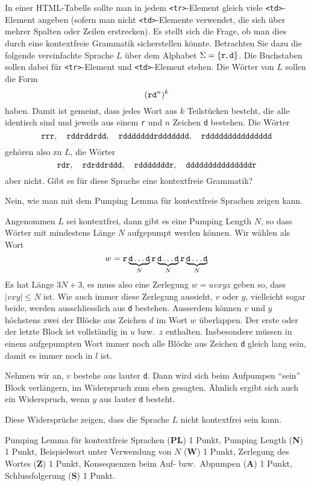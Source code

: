In einer HTML-Tabelle sollte man in jedem {\tt <tr>}-Element gleich
viele {\tt <td>}-Element angeben (sofern man nicht {\tt <td>}-Elemente
verwendet, die sich über mehrer Spalten oder Zeilen erstrecken).
Es stellt sich die Frage, ob man dies durch eine kontextfreie Grammatik
sicherstellen könnte.
Betrachten Sie dazu die folgende vereinfachte Sprache $L$ über dem Alphabet
$\Sigma=\{\text{\tt r}, \text{\tt d}\}$. Die Buchstaben sollen
dabei für {\tt <tr>}-Element und {\tt <td>}-Element stehen.
Die Wörter von $L$ sollen die Form
\[
(\text{\tt rd}^n)^k
\]
haben. Damit ist gemeint, dass jedes Wort aus $k$ Teilstücken besteht,
die alle identisch sind und jeweils aus einem {\tt r} und $n$ Zeichen
{\tt d} bestehen. Die Wörter
\[
\text{\tt rrr}, \quad
\text{\tt rddrddrdd},\quad
\text{\tt rdddddddrddddddd},\quad
\text{\tt rddddddddddddddd}
\]
gehören also zu $L$, die Wörter
\[
\text{\tt rdr}, \quad
\text{\tt rdrddrddd},\quad
\text{\tt rdddddddr},\quad
\text{\tt dddddddddddddddr}
\]
aber nicht.
Gibt es für diese Sprache eine kontextfreie Grammatik?


\begin{loesung}
Nein, wie man mit dem Pumping Lemma für kontextfreie Sprachen zeigen kann.

Angenommen $L$ sei kontextfrei, dann gibt es eine Pumping Length $N$, so
dass Wörter mit mindestens Länge $N$ aufgepumpt werden können. 
Wir wählen als Wort
\[
w=\text{\tt r}
\underbrace{\text{\tt d}\dots\text{\tt d}}_{N}
\text{\tt r}
\underbrace{\text{\tt d}\dots\text{\tt d}}_{N}
\text{\tt r}
\underbrace{\text{\tt d}\dots\text{\tt d}}_{N}
\]
Es hat Länge $3N+3$, es muss also eine Zerlegung $w=uvxyz$ geben
so, dass $|vxy|\le N$ ist. Wie auch immer diese Zerlegung aussieht,
$v$ oder $y$, vielleicht sogar beide, werden ausschliesslich aus {\tt d}
bestehen. Ausserdem können $v$ und $y$ höchstens zwei der Blöcke
aus Zeichen $d$ im Wort $w$ überlappen. Der erste oder der letzte Block
ist vollständig in $u$ bzw.~$z$ enthalten. Insbesondere müssen in
einem aufgepumpten Wort immer noch alle Blöcke aus Zeichen {\tt d}
gleich lang sein, damit es immer noch in $l$ ist.

Nehmen wir an, $v$ bestehe aus lauter {\tt d}. Dann wird sich beim
Aufpumpen ``sein'' Block verlängern, im Widerspruch zum eben gesagten.
Ähnlich ergibt sich auch ein Widerspruch, wenn  $y$ aus lauter {\tt d}
besteht.

Diese Widersprüche zeigen, dass die Sprache $L$ nicht kontextfrei sein
kann.
\end{loesung}

\begin{bewertung}
Pumping Lemma für kontextfreie Sprachen ({\bf PL}) 1 Punkt,
Pumping Length ({\bf N}) 1 Punkt,
Beispielwort unter Verwendung von $N$ ({\bf W}) 1 Punkt,
Zerlegung des Wortes ({\bf Z}) 1 Punkt,
Konsequenzen beim Auf- bzw.~Abpumpen ({\bf A}) 1 Punkt,
Schlussfolgerung ({\bf S}) 1 Punkt.
\end{bewertung}

